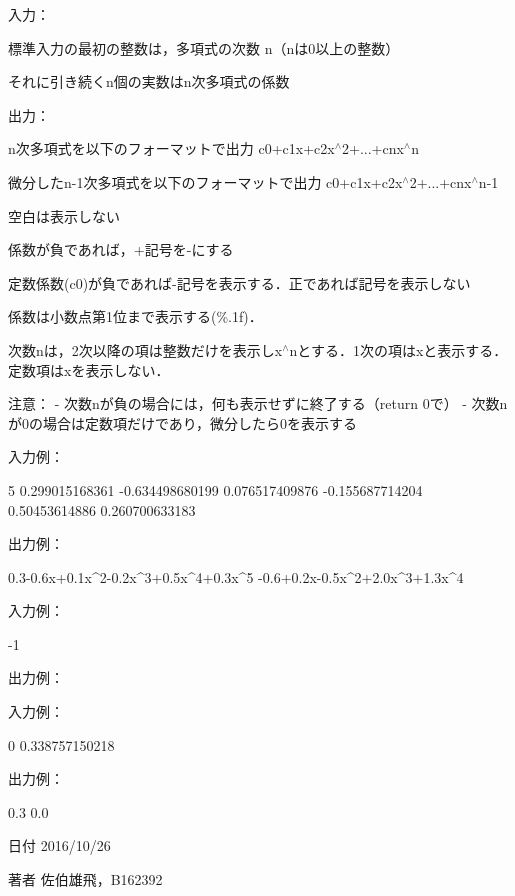 入力：
\begin{DoxyItemize}
\item 標準入力の最初の整数は，多項式の次数 n（nは0以上の整数）
\item それに引き続くn個の実数はn次多項式の係数
\end{DoxyItemize}

出力：
\begin{DoxyItemize}
\item n次多項式を以下のフォーマットで出力 c0+c1x+c2x$^\wedge$2+...+cnx$^\wedge$n
\item 微分したn-\/1次多項式を以下のフォーマットで出力 c0+c1x+c2x$^\wedge$2+...+cnx$^\wedge$n-\/1
\item 空白は表示しない
\item 係数が負であれば，+記号を-\/にする
\item 定数係数(c0)が負であれば-\/記号を表示する．正であれば記号を表示しない
\item 係数は小数点第1位まで表示する(\%.1f)．
\item 次数nは，2次以降の項は整数だけを表示しx$^\wedge$nとする．1次の項はxと表示する．定数項はxを表示しない． \begin{DoxyVerb}注意：
- 次数nが負の場合には，何も表示せずに終了する（return 0で）
- 次数nが0の場合は定数項だけであり，微分したら0を表示する

入力例：
\end{DoxyVerb}
 \begin{DoxyVerb}5 0.299015168361 -0.634498680199 0.076517409876 -0.155687714204 0.50453614886
0.260700633183
\end{DoxyVerb}
 出力例： \begin{DoxyVerb}0.3-0.6x+0.1x^2-0.2x^3+0.5x^4+0.3x^5
-0.6+0.2x-0.5x^2+2.0x^3+1.3x^4
\end{DoxyVerb}
 入力例： \begin{DoxyVerb}-1
\end{DoxyVerb}
 出力例： \begin{DoxyVerb}\end{DoxyVerb}
 入力例： \begin{DoxyVerb}0 0.338757150218
\end{DoxyVerb}
 出力例： \begin{DoxyVerb}0.3
0.0
\end{DoxyVerb}
 \begin{DoxyDate}{日付}
2016/10/26 
\end{DoxyDate}
\begin{DoxyAuthor}{著者}
佐伯雄飛，\-B162392 
\end{DoxyAuthor}

\end{DoxyItemize}

